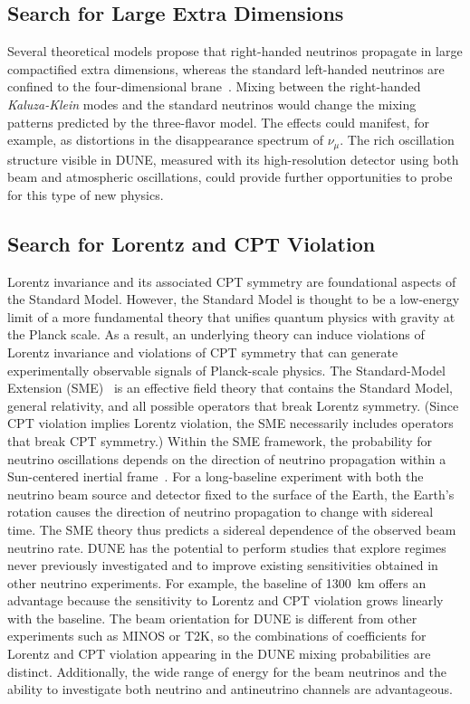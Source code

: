 \subsection{Search for Large Extra Dimensions}

Several theoretical models propose that right-handed neutrinos
propagate in large compactified extra dimensions, whereas the standard
left-handed neutrinos are confined to the four-dimensional 
brane~\cite{Machado:2011wx}. Mixing between the right-handed \emph{Kaluza-Klein} 
modes and the standard
neutrinos would change the mixing patterns predicted by
the three-flavor model. The effects could manifest, for example, as distortions in the
disappearance spectrum of $\nu_\mu$.  The rich oscillation
structure visible in DUNE, measured with
its high-resolution detector
using both beam and atmospheric oscillations,
could provide further opportunities to probe for
this type of new physics.

\subsection{Search for Lorentz and CPT Violation}

Lorentz invariance and its associated CPT symmetry
are foundational aspects of the Standard Model. However, the Standard Model is thought to be a low-energy limit of a more fundamental theory that unifies quantum physics with gravity at the Planck
scale. As a result, an underlying theory can induce violations of Lorentz invariance and
violations of CPT symmetry that can generate experimentally observable signals of Planck-scale physics.
The Standard-Model Extension (SME)~\cite{Colladay:1996iz,Colladay:1998fq,Kostelecky:2003fs} is an effective field theory that contains the Standard Model, general relativity, and all possible operators that break Lorentz symmetry. (Since CPT violation implies Lorentz violation, the SME necessarily includes operators that break CPT symmetry.)  Within the SME framework, the probability for neutrino oscillations depends on the direction of neutrino propagation within a Sun-centered inertial frame~\cite{Kostelecky:2003cr,Kostelecky:2011gq}.  For a long-baseline experiment with both the neutrino beam source and detector fixed to the surface of the Earth, the Earth's rotation causes the direction of neutrino propagation to change with sidereal time.  The SME theory thus predicts a sidereal dependence of the observed beam neutrino rate.  DUNE has the potential to perform studies that explore regimes never previously investigated and to improve existing
sensitivities obtained in other neutrino experiments.
For example, the baseline of 1300~km offers an advantage because the sensitivity to 
Lorentz and CPT violation grows linearly with the baseline.   The
beam orientation for DUNE is different from other experiments such as MINOS or T2K, so
the combinations of coefficients for Lorentz and CPT violation appearing in the DUNE mixing probabilities are
distinct. Additionally, the wide range of energy for the beam neutrinos and the ability to investigate both neutrino and antineutrino channels are advantageous.

